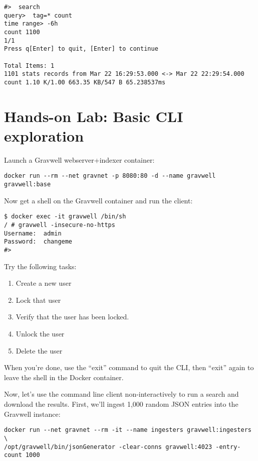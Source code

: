 \begin{Verbatim}[breaklines=true]
#>  search
query>  tag=* count
time range> -6h
count 1100
1/1
Press q[Enter] to quit, [Enter] to continue

Total Items: 1
1101 stats records from Mar 22 16:29:53.000 <-> Mar 22 22:29:54.000
count 1.10 K/1.00 663.35 KB/547 B 65.238537ms
\end{Verbatim}

\section{Hands-on Lab: Basic CLI exploration}

Launch a Gravwell webserver+indexer container:

\begin{Verbatim}[breaklines=true]
docker run --rm --net gravnet -p 8080:80 -d --name gravwell gravwell:base
\end{Verbatim}

Now get a shell on the Gravwell container and run the client:

\begin{Verbatim}[breaklines=true]
$ docker exec -it gravwell /bin/sh
/ # gravwell -insecure-no-https
Username:  admin
Password:  changeme
#>
\end{Verbatim}

Try the following tasks:

\begin{enumerate}
\item
  {Create a new user}
\item
  {Lock that user}
\item
  {Verify that the user has been locked.}
\item
  {Unlock the user}
\item
  {Delete the user}
\end{enumerate}

When you're done, use the ``exit'' command to quit the CLI, then ``exit'' again to leave the shell in the Docker container.

Now, let's use the command line client non-interactively to run
a search and download the results. First, we'll ingest 1,000 random JSON
entries into the Gravwell instance:


\begin{Verbatim}[breaklines=true]
docker run --net gravnet --rm -it --name ingesters gravwell:ingesters \
/opt/gravwell/bin/jsonGenerator -clear-conns gravwell:4023 -entry-count 1000
\end{Verbatim}



